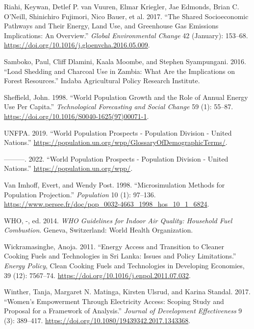 \documentclass[
]{article}
\newlength{\cslhangindent}
\newlength{\cslentryspacingunit} %
\newenvironment{CSLReferences}[2] %
 {%
  \setlength{\parindent}{0pt}
  \ifodd #1
  \let\oldpar\par
  \def\par{\hangindent=\cslhangindent\oldpar}
  \fi
  \setlength{\parskip}{#2\cslentryspacingunit}
 }%
 {}
\begin{document}
\begin{CSLReferences}{1}{0}
\leavevmode{}%
Riahi, Keywan, Detlef P. van Vuuren, Elmar Kriegler, Jae Edmonds, Brian C. O'Neill, Shinichiro Fujimori, Nico Bauer, et al. 2017. {``The {Shared} {Socioeconomic} {Pathways} and Their Energy, Land Use, and Greenhouse Gas Emissions Implications: {An} Overview.''} \emph{Global Environmental Change} 42 (January): 153--68. \url{https://doi.org/10.1016/j.gloenvcha.2016.05.009}.

\leavevmode{}%
Samboko, Paul, Cliff Dlamini, Kaala Moombe, and Stephen Syampungani. 2016. {``Load Shedding and Charcoal Use in {Zambia}: {What} Are the Implications on Forest Resources.''} Indaba Agricultural Policy Research Institute.

\leavevmode{}%
Sheffield, John. 1998. {``World {Population} {Growth} and the {Role} of {Annual} {Energy} {Use} Per {Capita}.''} \emph{Technological Forecasting and Social Change} 59 (1): 55--87. \url{https://doi.org/10.1016/S0040-1625(97)00071-1}.

\leavevmode{}%
UNFPA. 2019. {``World {Population} {Prospects} - {Population} {Division} - {United} {Nations}.''} \url{https://population.un.org/wpp/GlossaryOfDemographicTerms/}.

\leavevmode{}%
---------. 2022. {``World {Population} {Prospects} - {Population} {Division} - {United} {Nations}.''} \url{https://population.un.org/wpp/}.

\leavevmode{}%
Van Imhoff, Evert, and Wendy Post. 1998. {``Microsimulation Methods for Population Projection.''} \emph{Population} 10 (1): 97--136. \url{https://www.persee.fr/doc/pop_0032-4663_1998_hos_10_1_6824}.

\leavevmode{}%
WHO, -, ed. 2014. \emph{{WHO} Guidelines for Indoor Air Quality: Household Fuel Combustion}. Geneva, Switzerland: World Health Organization.

\leavevmode{}%
Wickramasinghe, Anoja. 2011. {``Energy Access and Transition to Cleaner Cooking Fuels and Technologies in {Sri} {Lanka}: {Issues} and Policy Limitations.''} \emph{Energy Policy}, Clean {Cooking} {Fuels} and {Technologies} in {Developing} {Economies}, 39 (12): 7567--74. \url{https://doi.org/10.1016/j.enpol.2011.07.032}.

\leavevmode{}%
Winther, Tanja, Margaret N. Matinga, Kirsten Ulsrud, and Karina Standal. 2017. {``Women's Empowerment Through Electricity Access: Scoping Study and Proposal for a Framework of Analysis.''} \emph{Journal of Development Effectiveness} 9 (3): 389--417. \url{https://doi.org/10.1080/19439342.2017.1343368}.

\end{CSLReferences}
\end{document}
